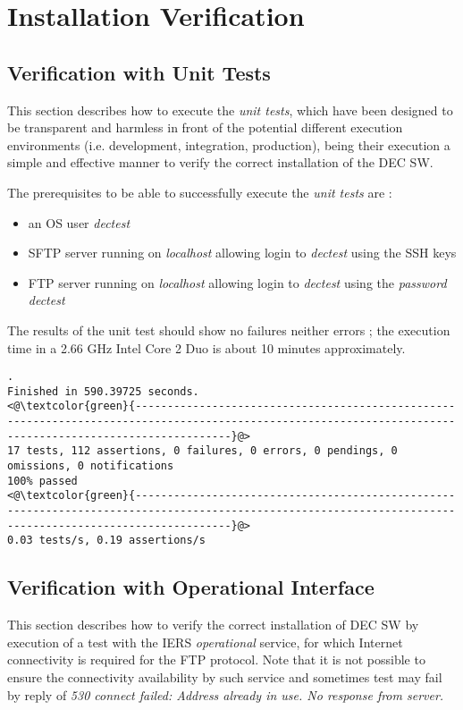 \documentclass[dec_sum_main.tex]{subfiles}
\begin{document}
\section{Installation Verification}
\subsection{Verification with Unit Tests}
This section describes how to execute the \textit{unit tests}, which have been designed to be transparent and harmless in front of the potential different execution environments (i.e. development, integration, production), being their execution a simple and effective manner to verify the correct installation of the DEC SW. \newline
\par
The prerequisites to be able to successfully execute the \textit{unit tests} are :
\begin{itemize}
	\item an OS user \textit{dectest}
	\item SFTP server running on \textit{localhost} allowing login to \textit{dectest} using the SSH keys
	\item FTP server running on \textit{localhost} allowing login to \textit{dectest} using the \textit{password} \textit{dectest} \newline
\end{itemize} 
\par
{} \newline

\noindent
The results of the unit test should show no failures neither errors ; the execution time in a 2.66 GHz Intel Core 2 Duo is about 10 minutes approximately.
\begin{lstlisting}
.
Finished in 590.39725 seconds.
<@\textcolor{green}{-----------------------------------------------------------------------------------------------------------------------------------------------------------}@>
17 tests, 112 assertions, 0 failures, 0 errors, 0 pendings, 0 omissions, 0 notifications
100% passed
<@\textcolor{green}{-----------------------------------------------------------------------------------------------------------------------------------------------------------}@>
0.03 tests/s, 0.19 assertions/s
\end{lstlisting}

\subsection{Verification with Operational Interface}
This section describes how to verify the correct installation of DEC SW by execution of a test with the IERS \textit{operational} service, for which Internet connectivity is required for the FTP protocol. Note that it is not possible to ensure the connectivity availability by such service and sometimes test may fail by reply of \textit{530 connect failed: Address already in use. No response from server.} \newline
\end{document}
